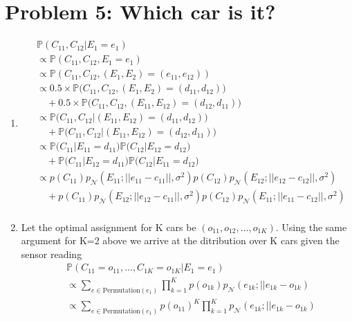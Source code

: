 \documentclass[12pt]{article}
\begin{document}
\section*{Problem 5: Which car is it?}
\begin{enumerate}[label=(\alph*)]
	\item
	\begin{align*}
		&\mathbb{P}(C_{11},C_{12}|E_1=e_1) \\
		&\propto \mathbb{P}(C_{11},C_{12}, E_1=e_1) \\
		&\propto \mathbb{P}(C_{11},C_{12}, (E_1, E_2)=(e_{11}, e_{12})) \\
		&\propto 0.5 \times \mathbb{P}\Big(C_{11},C_{12}, (E_1, E_2)=(d_{11}, d_{12})\Big)\\
		&\quad+ 0.5 \times \mathbb{P}\Big(C_{11},C_{12}, (E_{11}, E_{12})=(d_{12}, d_{11}) \Big) \\
		&\propto \mathbb{P}\Big(C_{11},C_{12} | (E_{11}, E_{12})=(d_{11}, d_{12})\Big)\\
		&\quad+ \mathbb{P}\Big(C_{11},C_{12} | (E_{11}, E_{12})=(d_{12}, d_{11}) \Big) \\
		&\propto \mathbb{P}\Big(C_{11} | E_{11}=d_{11} \Big)  \mathbb{P}\Big(C_{12} | E_{12}=d_{12} \Big) \\
		&\quad +\mathbb{P}\Big(C_{11} | E_{12}=d_{11} \Big)  \mathbb{P}\Big(C_{12} | E_{11}=d_{12} \Big) \\
		&\propto p(C_{11})p_{\mathcal{N}}(E_{11};||e_{11} - c_{11}||, \sigma^2) p(C_{12})p_{\mathcal{N}}(E_{12};||e_{12} - c_{12}||, \sigma^2) \\
		&\quad +p(C_{11})p_{\mathcal{N}}(E_{12};||e_{12} - c_{11}||, \sigma^2) p(C_{12})p_{\mathcal{N}}(E_{11};||e_{11} - c_{12}||, \sigma^2) \\
	\end{align*}
	\item
		Let the optimal assignment for K cars be $(o_{11}, o_{12},\dots,o_{1K})$. Using the same argument for K=2 above we arrive at the ditribution over K cars given the sensor reading
		\begin{align*}
			&\mathbb{P}(C_{11}=o_{11},\dots,C_{1K}=o_{1K}|E_1=e_1) \\
			&\propto \sum_{e \in \text{Permutation}(e_1)}\prod_{k=1}^K p(o_{1k})p_{\mathcal{N}}(e_{1k};||e_{1k} - o_{1k}) \\
			&\propto \sum_{e \in \text{Permutation}(e_1)}p(o_{11})^K\prod_{k=1}^K p_{\mathcal{N}}(e_{1k};||e_{1k} - o_{1k}) \\
		\end{align*}

\end{enumerate}
\end{document}
